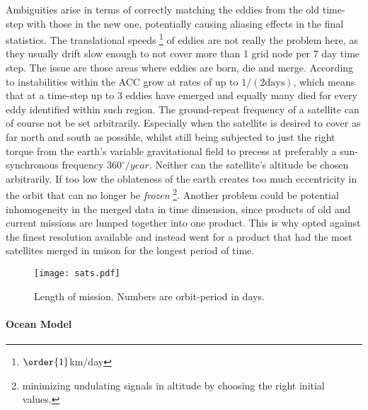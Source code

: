 Ambiguities arise in terms of correctly matching the eddies from the old time-step with those in the new one, potentially causing aliasing effects in the final
statistics. The translational speeds \footnote{$\order{1}$km/day} of eddies are not really the problem here, as they usually drift slow enough to not cover more
than 1 grid node per 7 day time step. The issue are those areas where eddies are born, die and merge. According to \cite{Smith2009} instabilities within the ACC
grow at rates of up to $1/(2 \mathrm{days})$, which means that at a time-step up to 3 eddies have emerged and equally many died for every eddy identified within
such region. The ground-repeat frequency of a satellite can of course not be set arbitrarily. Especially when the satellite is desired to cover as far north and
south as possible, whilst still being subjected to just the right torque from the earth's variable gravitational field to precess at preferably a
sun-synchronous frequency \ie $360^{\circ}/year$. Neither can the
satellite's altitude be chosen arbitrarily. If too low the oblateness of the earth creates too much eccentricity in the orbit that can no longer be
\textit{frozen} \footnote{minimizing undulating signals in altitude by choosing the right initial values.}. Another problem could be potential inhomogeneity in
the merged data in time dimension, since products of old and current missions are lumped together into one product. This is why \cite{Chelton2011} opted against
the finest resolution available and instead went for a product that had the most satellites merged in unison for the longest period of time.

\begin{figure}[h!]
\texttt{[image: sats.pdf]}
\caption{Length of mission. Numbers are orbit-period in days.}
\end{figure}



\paragraph{Ocean Model}


